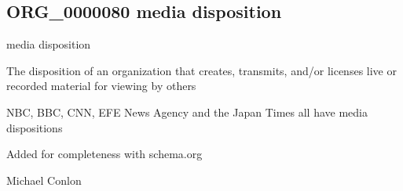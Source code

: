 \documentclass[letterpaper,10pt,english]{sphinxmanual}
\begin{document}
\subsection{ORG\_0000080 \sphinxhyphen{} media disposition}
\label{\detokenize{doc-ORG_0000080:org-0000080-media-disposition}}\label{\detokenize{doc-ORG_0000080:index-0}}\label{\detokenize{doc-ORG_0000080::doc}}
\begin{sphinxShadowBox}

\sphinxAtStartPar
media disposition
\end{sphinxShadowBox}

\begin{sphinxShadowBox}

\sphinxAtStartPar
{\hyperref[\detokenize{doc-BFO_0000016::doc}]{}}
\end{sphinxShadowBox}

\begin{sphinxShadowBox}

\sphinxAtStartPar
The disposition of an organization that creates, transmits, and/or licenses live or recorded material for viewing by others
\end{sphinxShadowBox}

\begin{sphinxShadowBox}

\sphinxAtStartPar
{}
\end{sphinxShadowBox}

\begin{sphinxShadowBox}

\sphinxAtStartPar
NBC, BBC, CNN, EFE News Agency and the Japan Times all have media dispositions
\end{sphinxShadowBox}

\begin{sphinxShadowBox}

\sphinxAtStartPar
Added for completeness with schema.org
\end{sphinxShadowBox}

\begin{sphinxShadowBox}

\sphinxAtStartPar
Michael Conlon 
\end{sphinxShadowBox}
\begin{quote}

\ignorespaces \end{quote}
\end{document}
